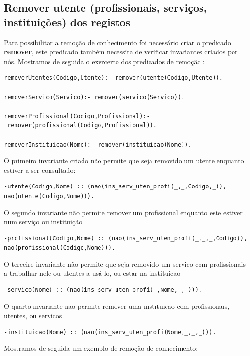 \subsection{Remover utente (profissionais, serviços, instituições) dos registos}

Para possibilitar a remoção de conhecimento foi necessário criar o predicado \textbf{remover}, este predicado também necessita de verificar invariantes criados por nós. Mostramos de seguida o exercerto dos predicados de remoção :

\begin{Verbatim}
removerUtentes(Codigo,Utente):- remover(utente(Codigo,Utente)).

removerServico(Servico):- remover(servico(Servico)).

removerProfissional(Codigo,Profissional):-
 remover(profissional(Codigo,Profissional)).

removerInstituicao(Nome):- remover(instituicao(Nome)).
\end{Verbatim}

O primeiro invariante criado não permite que seja removido um utente enquanto estiver a ser consultado: 

\begin{Verbatim}
-utente(Codigo,Nome) :: (nao(ins_serv_uten_profi(_,_,Codigo,_)),
nao(utente(Codigo,Nome))).
\end{Verbatim}

O segundo invariante não permite remover um profissional enquanto este estiver num serviço ou instituição. 

\begin{Verbatim}
-profissional(Codigo,Nome) :: (nao(ins_serv_uten_profi(_,_,_,Codigo)),
nao(profissional(Codigo,Nome))).
\end{Verbatim}

O terceiro invariante não permite  que seja removido um servico com profissionais a trabalhar nele ou utentes a usá-lo, ou estar na instituicao

\begin{Verbatim}
-servico(Nome) :: (nao(ins_serv_uten_profi(_,Nome,_,_))).
\end{Verbatim}

O quarto invariante não permite remover uma instituicao com profissionais, utentes, ou servicos
\begin{Verbatim}
-instituicao(Nome) :: (nao(ins_serv_uten_profi(Nome,_,_,_))).
\end{Verbatim}

Mostramos de seguida um exemplo de remoção de conhecimento: 

